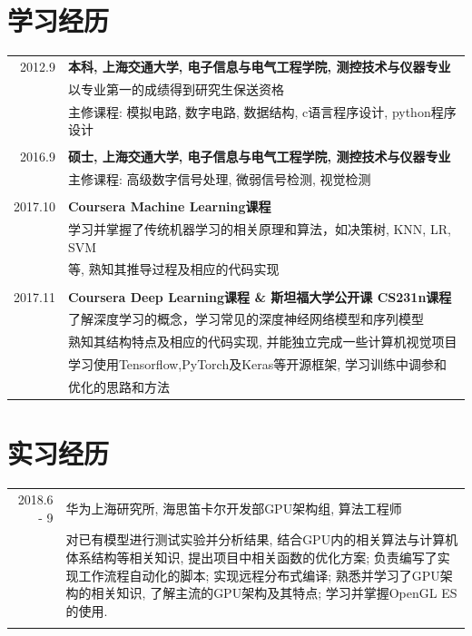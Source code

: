 \documentclass[a4paper,11pt]{article}
\begin{document}
\section{学习经历}
\begin{tabular}{rl}
\textsc{2012.9} & \bf{本科, 上海交通大学, 电子信息与电气工程学院, 测控技术与仪器专业}\\
& 以专业第一的成绩得到研究生保送资格\\
& 主修课程: 模拟电路, 数字电路, 数据结构, c语言程序设计, python程序设计\\&\\
\textsc{2016.9} & \bf{硕士, 上海交通大学, 电子信息与电气工程学院, 测控技术与仪器专业}\\
& 主修课程: 高级数字信号处理, 微弱信号检测, 视觉检测\\&\\
\textsc{2017.10} & \bf{Coursera Machine Learning课程}\\
& 学习并掌握了传统机器学习的相关原理和算法，如决策树, KNN, LR, SVM\\
& 等, 熟知其推导过程及相应的代码实现\\&\\
\textsc{2017.11} & \bf{Coursera Deep Learning课程 \& 斯坦福大学公开课 CS231n课程}\\
& 了解深度学习的概念，学习常见的深度神经网络模型和序列模型\\
& 熟知其结构特点及相应的代码实现, 并能独立完成一些计算机视觉项目\\
& 学习使用Tensorflow,PyTorch及Keras等开源框架, 学习训练中调参和\\
& 优化的思路和方法\\
\end{tabular}

\section{实习经历}
\begin{tabular}{r|p{11cm}}
 \textsc{2018.6 - 9} & 华为上海研究所, 海思笛卡尔开发部GPU架构组, 算法工程师 \\&\footnotesize{对已有模型进行测试实验并分析结果, 结合GPU内的相关算法与计算机体系结构等相关知识, 提出项目中相关函数的优化方案; 负责编写了实现工作流程自动化的脚本; 实现远程分布式编译; 熟悉并学习了GPU架构的相关知识, 了解主流的GPU架构及其特点; 学习并掌握OpenGL ES的使用.}\\\multicolumn{2}{c}{} \\
\end{tabular}
\end{document}
